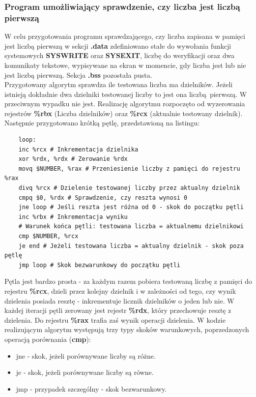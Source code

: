 \documentclass[a4paper,12pt]{article}
\begin{document}
\subsubsection{Program umożliwiający sprawdzenie, czy liczba jest liczbą pierwszą}
W celu przygotowania programu sprawdzającego, czy liczba zapisana w pamięci jest liczbą pierwszą w sekcji \textbf{.data} zdefiniowano stałe do wywołania funkcji systemowych \textbf{SYSWRITE} oraz \textbf{SYSEXIT}, liczbę do weryfikacji oraz dwa komunikaty tekstowe, wypisywane na ekran w momencie, gdy liczba jest lub nie jest liczbą pierwszą. Sekcja \textbf{.bss} pozostała pusta.\\
Przygotowany algorytm sprawdza ile testowana liczba ma dzielników. Jeżeli istnieją dokładnie dwa dzielniki testowanej liczby to jest ona liczbą pierwszą. W przeciwnym wypadku nie jest. Realizację algorytmu rozpoczęto od wyzerowania rejestrów \textbf{\%rbx} (Liczba dzielników) oraz \textbf{\%rcx} (aktualnie testowany dzielnik). Następnie przygotowano krótką pętlę, przedstawioną na listingu:
\begin{verbatim}
	loop:
	inc %rcx # Inkrementacja dzielnika
	xor %rdx, %rdx # Zerowanie %rdx
	movq $NUMBER, %rax # Przeniesienie liczby z pamięci do rejestru %rax 
	divq %rcx # Dzielenie testowanej liczby przez aktualny dzielnik
	cmpq $0, %rdx # Sprawdzenie, czy reszta wynosi 0
	jne loop # Jeśli reszta jest różna od 0 - skok do początku pętli
	inc %rbx # Inkrementacja wyniku
	# Warunek końca pętli: testowana liczba = aktualnemu dzielnikowi
	cmp $NUMBER, %rcx 
	je end # Jeżeli testowana liczba = aktualny dzielnik - skok poza pętlę
	jmp loop # Skok bezwarunkowy do początku pętli
\end{verbatim} 
Pętla jest bardzo prosta - za każdym razem pobiera testowaną liczbę z pamięci do rejestru \textbf{\%rcx}, dzieli przez kolejny dzielnik i w zależności od tego, czy wynik dzielenia posiada resztę  - inkrementuje licznik dzielników o jeden lub nie. W każdej iteracji pętli zerowany jest rejestr \textbf{\%rdx}, który przechowuje resztę z dzielenia. Do rejestru \textbf{\%rax} trafia zaś wynik operacji dzielenia. W kodzie realizującym algorytm występują trzy typy skoków warunkowych, poprzedzonych operacją porównania (\textbf{cmp}):
\begin{itemize}
	\item jne - skok, jeżeli porównywane liczby są różne.
	\item je - skok, jeżeli porównywane liczby są równe.
	\item jmp - przypadek szczególny - skok bezwarunkowy.
\end{itemize}
\end{document}
